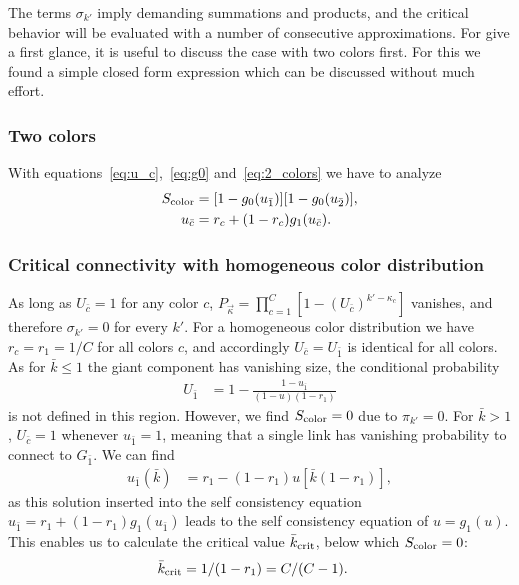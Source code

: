 \documentclass[aps, pre, onecolumn, a4paper, floatfix]{revtex4}
\begin{document}
The terms $\sigma_{k'}$ imply demanding summations and products, 
and the critical behavior will be evaluated with a number of consecutive approximations. 
For give a first glance, it is useful to discuss the case with two colors first. 
For this we found a simple closed form expression 
which can be discussed without much effort. 

\subsubsection{Two colors}

With equations~\eqref{eq:u_c},~\eqref{eq:g0} and~\eqref{eq:2_colors} we have to analyze 
\begin{align}
S_{\rm color} &= [1-g_0(u_{\bar 1})] [1-g_0(u_{\bar 2})],\\
u_{\bar c} &= r_c+(1-r_c) g_1(u_{\bar c}).
\end{align}




\subsubsection{Critical connectivity with homogeneous color distribution}

As long as $U_{\bar c}=1$ for any color $c$, 
$P_{\vec \kappa} = \prod_{c=1}^C [1-(U_{\bar c})^{k'- \kappa_{c} }]$ 
vanishes, and therefore $\sigma_{k'}=0$ for every $k'$. For a homogeneous color 
distribution we have $r_c=r_1=1/C$ for all colors $c$, and accordingly 
$U_{\bar c}=U_{\bar 1}$ is identical for all colors. As for $\bar{k}\leq 1$ the 
giant component has vanishing size, the conditional probability 
\begin{align}
U_{\bar 1} &= 1 - \frac{1-u_{\bar 1}}{(1-u)(1-r_1)}
\end{align}
is not defined in this region. However, we find $S_{\rm color}=0$ due to $\pi_{k'}=0$. 
For $\bar{k}>1$, $U_{\bar c}=1$ whenever $u_{\bar 1}=1$, meaning that a single link has vanishing 
probability to connect to $G_{\bar 1}$. We can find 
\begin{align}
u_{\bar 1}(\bar{k}) &= r_1 - (1-r_1)u[\bar{k}(1-r_1)],\label{eq:u_1_solution}
\end{align}
as this solution inserted into the self consistency equation $u_{\bar 1}=r_1+(1-r_1)g_1(u_{\bar 1})$
leads to the self consistency equation of $u=g_1(u)$. This enables us to calculate the critical 
value $\bar{k}_{\rm crit}$, below which $S_{\rm color}=0$: 
\begin{align}
{\bar k}_{\rm crit} &= 1/(1-r_1) = C/(C-1).
\end{align}
\end{document}
